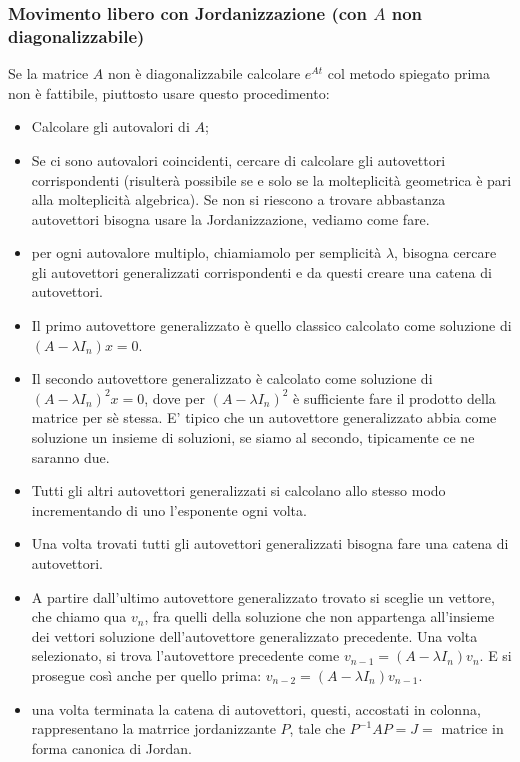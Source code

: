 \begin{landscape}
\begin{multicols*}{3}
    \subsubsection*{Movimento libero con Jordanizzazione (con $A$ non diagonalizzabile)}
    Se la matrice $A$ non è diagonalizzabile calcolare $e^{At}$ col metodo spiegato prima non è fattibile, piuttosto usare questo procedimento:
    \begin{itemize}
        \item Calcolare gli autovalori di $A$;
        \item Se ci sono autovalori coincidenti, cercare di calcolare gli autovettori corrispondenti (risulterà possibile se e solo se la molteplicità geometrica è pari alla molteplicità algebrica). Se non si riescono a trovare abbastanza autovettori bisogna usare la Jordanizzazione, vediamo come fare.
        \item per ogni autovalore multiplo, chiamiamolo per semplicità $\lambda$, bisogna cercare gli autovettori generalizzati corrispondenti e da questi creare una catena di autovettori.
        \item Il primo autovettore generalizzato è quello classico calcolato come soluzione di $(A-\lambda I_n) x = 0$.
        \item Il secondo autovettore generalizzato è calcolato come soluzione di $(A-\lambda I_n)^2 x = 0$, dove per $(A-\lambda I_n)^2$ è sufficiente fare il prodotto della matrice per sè stessa. E' tipico che un autovettore generalizzato abbia come soluzione un insieme di soluzioni, se siamo al secondo, tipicamente ce ne saranno due.
        \item Tutti gli altri autovettori generalizzati si calcolano allo stesso modo incrementando di uno l'esponente ogni volta.
        \item Una volta trovati tutti gli autovettori generalizzati bisogna fare una catena di autovettori.
        \item A partire dall'ultimo autovettore generalizzato trovato si sceglie un vettore, che chiamo qua $v_n$, fra quelli della soluzione che non appartenga all'insieme dei vettori soluzione dell'autovettore generalizzato precedente. Una volta selezionato, si trova l'autovettore precedente come $v_{n-1} = (A- \lambda I_n)v_n$. E si prosegue così anche per quello prima: $v_{n-2} = (A-\lambda I_n) v_{n-1}$.
        \item una volta terminata la catena di autovettori, questi, accostati in colonna, rappresentano la matrrice jordanizzante $P$, tale che $P^{-1} A P = J =$ matrice in forma canonica di Jordan.

\end{itemize}
\end{multicols*}
\end{landscape}
